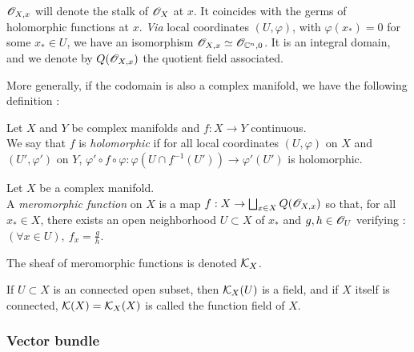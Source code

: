 \begin{myrem}
$\mathscr{O}_{X,x}$ will denote the stalk of $\mathscr{O}_X$ at $x$. It coincides with the germs of holomorphic functions at $x$. \textit{Via} local coordinates $(U,\varphi)$, with $\varphi(x_*)=0$ for some $x_*\in U$, we have an isomorphism $\mathscr{O}_{X,x} \simeq \mathscr{O}_{\mathbb{C}^n,0}$. It is an integral domain, and we denote by $Q(\mathscr{O}_{X,x})$ the quotient field associated.
\end{myrem}

More generally, if the codomain is also a complex manifold, we have the following definition :

\begin{mydef}
Let $X$ and $Y$ be complex manifolds and $f : X \to Y$ continuous.\\
We say that $f$ is \textit{holomorphic} if for all local coordinates $(U,\varphi)$ on $X$ and $(U',\varphi')$ on $Y$, $\varphi'\circ f\circ \varphi : \varphi(U \cap f^{-1}(U')) \to \varphi'(U')$ is holomorphic.
\end{mydef}

\begin{mydef}
Let $X$ be a complex manifold.\\
A \textit{meromorphic function} on $X$ is a map $f : X \to \bigsqcup_{x\in X} Q(\mathscr{O}_{X,x})$ so that, for all $x_* \in X$, there exists an open neighborhood $U \subset X$ of $x_*$ and $g,h \in \mathscr{O}_U$ verifying : $(\forall x\in U), ~f_x = \frac{g}{h}$.

\smallskip
The sheaf of meromorphic functions is denoted $\mathcal{K}_X$.
\end{mydef}

\begin{myrem}
If $U\subset X$ is an connected open subset, then $\mathcal{K}_X(U)$ is a field, and if $X$ itself is connected, $\mathcal{K}(X) = \mathcal{K}_X(X)$ is called the function field of $X$.
\end{myrem}


\subsubsection{Vector bundle}

